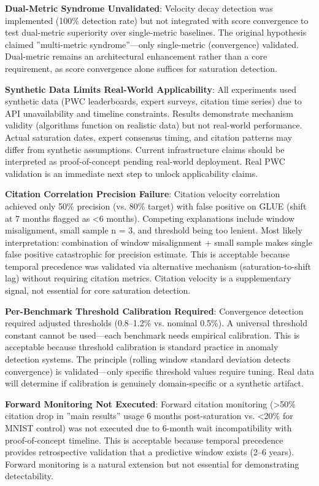 
\textbf{Dual-Metric Syndrome Unvalidated}: Velocity decay detection was implemented (100\% detection rate) but not integrated with score convergence to test dual-metric superiority over single-metric baselines. The original hypothesis claimed ''multi-metric syndrome''---only single-metric (convergence) validated. Dual-metric remains an architectural enhancement rather than a core requirement, as score convergence alone suffices for saturation detection.

\textbf{Synthetic Data Limits Real-World Applicability}: All experiments used synthetic data (PWC leaderboards, expert surveys, citation time series) due to API unavailability and timeline constraints. Results demonstrate mechanism validity (algorithms function on realistic data) but not real-world performance. Actual saturation dates, expert consensus timing, and citation patterns may differ from synthetic assumptions. Current infrastructure claims should be interpreted as proof-of-concept pending real-world deployment. Real PWC validation is an immediate next step to unlock applicability claims.

\textbf{Citation Correlation Precision Failure}: Citation velocity correlation achieved only 50\% precision (vs. 80\% target) with false positive on GLUE (shift at 7 months flagged as <6 months). Competing explanations include window misalignment, small sample n = 3, and threshold being too lenient. Most likely interpretation: combination of window misalignment + small sample makes single false positive catastrophic for precision estimate. This is acceptable because temporal precedence was validated via alternative mechanism (saturation-to-shift lag) without requiring citation metrics. Citation velocity is a supplementary signal, not essential for core saturation detection.

\textbf{Per-Benchmark Threshold Calibration Required}: Convergence detection required adjusted thresholds (0.8--1.2\% vs. nominal 0.5\%). A universal threshold constant cannot be used---each benchmark needs empirical calibration. This is acceptable because threshold calibration is standard practice in anomaly detection systems. The principle (rolling window standard deviation detects convergence) is validated---only specific threshold values require tuning. Real data will determine if calibration is genuinely domain-specific or a synthetic artifact.

\textbf{Forward Monitoring Not Executed}: Forward citation monitoring (>50\% citation drop in ''main results'' usage 6 months post-saturation vs. <20\% for MNIST control) was not executed due to 6-month wait incompatibility with proof-of-concept timeline. This is acceptable because temporal precedence provides retrospective validation that a predictive window exists (2--6 years). Forward monitoring is a natural extension but not essential for demonstrating detectability.
